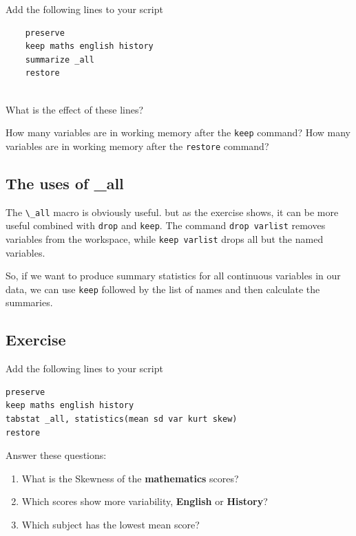 \documentclass[
]{article}
\providecommand{\tightlist}{%
  \setlength{\itemsep}{0pt}\setlength{\parskip}{0pt}}
\begin{document}
Add the following lines to your script

\begin{verbatim}
    preserve
    keep maths english history
    summarize _all
    restore
    
\end{verbatim}

What is the effect of these lines?

How many variables are in working memory after the \texttt{keep} command? How many variables are in working memory after the \texttt{restore} command?

\hypertarget{the-uses-of-_all}{%
\subsection{The uses of \_all}\label{the-uses-of-_all}}

The \texttt{\textbackslash{}\_all} macro is obviously useful. but as the exercise shows, it can be more useful combined with \texttt{drop} and \texttt{keep}. The command \texttt{drop\ varlist} removes variables from the workspace, while \texttt{keep\ varlist} drops all but the named variables.

So, if we want to produce summary statistics for all continuous variables in our data, we can use \texttt{keep} followed by the list of names and then calculate the summaries.

\hypertarget{exercise-8}{%
\subsection{Exercise}\label{exercise-8}}

Add the following lines to your script

\begin{verbatim}
preserve
keep maths english history
tabstat _all, statistics(mean sd var kurt skew)
restore
\end{verbatim}

Answer these questions:

\begin{enumerate}
\def\labelenumi{\arabic{enumi}.}
\tightlist
\item
  What is the Skewness of the \textbf{mathematics} scores?
\item
  Which scores show more variability, \textbf{English} or \textbf{History}?
\item
  Which subject has the lowest mean score?
\end{enumerate}
\end{document}
